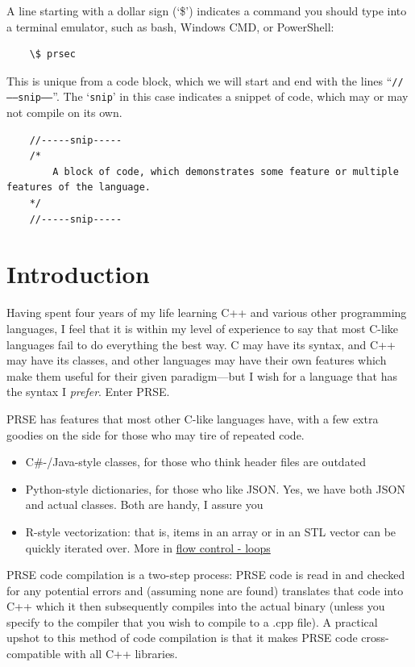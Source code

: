 \documentclass[letterpaper, 12pt]{article}
\begin{document}
A line starting with a dollar sign (`\$') indicates a command you should type into a terminal emulator, such as bash, Windows CMD, or PowerShell:
\begin{lstlisting}
    \$ prsec
\end{lstlisting}

This is unique from a code block, which we will start and end with the lines ``\texttt{//-----snip-----}''.
The `\texttt{snip}' in this case indicates a snippet of code, which may or may not compile on its own.
\begin{lstlisting}
    //-----snip-----
    /*
        A block of code, which demonstrates some feature or multiple features of the language.
    */
    //-----snip-----
\end{lstlisting}

\section{Introduction}
Having spent four years of my life learning C++ and various other programming languages, I feel that
it is within my level of experience to say that most C-like languages fail to do everything the best
way. C may have its syntax, and C++ may have its classes, and other languages may have their own
features which make them useful for their given paradigm---but I wish for a language that has the
syntax I {\em prefer}. Enter PRSE.\linebreak

PRSE has features that most other C-like languages have, with a few extra goodies on the side for
those who may tire of repeated code.

\begin{itemize}
\item C\#-/Java-style classes, for those who think header files are outdated
\item Python-style dictionaries, for those who like JSON. Yes, we have both JSON and actual classes.
   Both are handy, I assure you
\item R-style vectorization: that is, items in an array or in an STL vector can be quickly iterated
   over. More in \hyperref[sec:flowcontrol-loops]{flow control - loops}
\end{itemize}

PRSE code compilation is a two-step process: PRSE code is read in and checked for any potential
errors and (assuming none are found) translates that code into C++ which it then subsequently
compiles into the actual binary (unless you specify to the compiler that you wish to compile to a
.cpp file). A practical upshot to this method of code compilation is that it makes PRSE code
cross-compatible with all C++ libraries.
\end{document}
